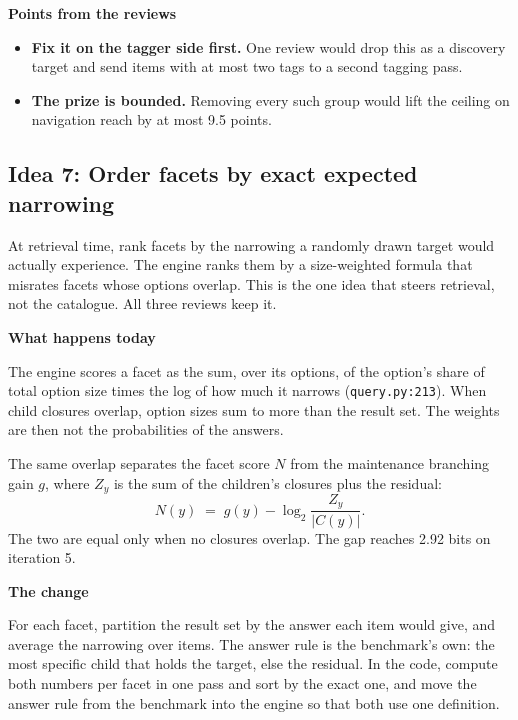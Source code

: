 \documentclass[10pt,a4paper]{article}
\newcommand{\code}[1]{\texttt{#1}}
\newcommand{\lab}[1]{\par\vspace{0.35em}\textbf{#1}\par\nobreak}
\begin{document}
\lab{Points from the reviews}
\begin{itemize}
\item \textbf{Fix it on the tagger side first.} One review would drop this as a discovery target and send items with at most two tags to a second tagging pass.
\item \textbf{The prize is bounded.} Removing every such group would lift the ceiling on navigation reach by at most 9.5 points.
\end{itemize}

\subsection{Idea 7: Order facets by exact expected narrowing}

At retrieval time, rank facets by the narrowing a randomly drawn target would actually experience. The engine
ranks them by a size-weighted formula that misrates facets whose options overlap. This is the one idea that
steers retrieval, not the catalogue. All three reviews keep it.

\lab{What happens today}
The engine scores a facet as the sum, over its options, of the option's share of total option size times the
log of how much it narrows (\code{query.py:213}). When child closures overlap, option sizes sum to more than
the result set. The weights are then not the probabilities of the answers.

The same overlap separates the facet score $N$ from the maintenance branching gain $g$, where $Z_y$ is the sum
of the children's closures plus the residual:
\begin{equation}
N(y) \;=\; g(y) - \log_2\!\frac{Z_y}{|C(y)|}.
\end{equation}
The two are equal only when no closures overlap. The gap reaches 2.92 bits on iteration 5.

\lab{The change}
For each facet, partition the result set by the answer each item would give, and average the narrowing over
items. The answer rule is the benchmark's own: the most specific child that holds the target, else the
residual. In the code, compute both numbers per facet in one pass and sort by the exact one, and move the
answer rule from the benchmark into the engine so that both use one definition.
\end{document}
